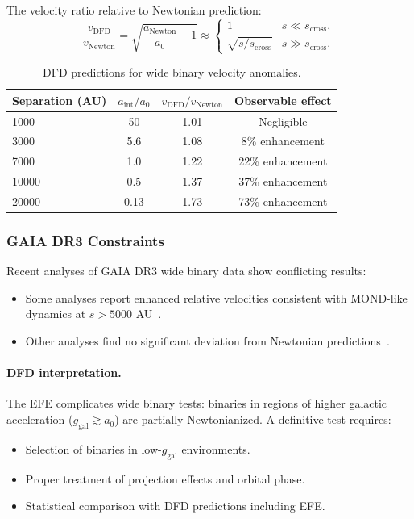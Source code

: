 The velocity ratio relative to Newtonian prediction:
\begin{equation}
\frac{v_{\mathrm{DFD}}}{v_{\mathrm{Newton}}} = \sqrt{\frac{a_{\mathrm{Newton}}}{a_0} + 1} \approx 
\begin{cases}
1 & s \ll s_{\mathrm{cross}}, \\
\sqrt{s/s_{\mathrm{cross}}} & s \gg s_{\mathrm{cross}}.
\end{cases}
\end{equation}

\begin{table}[h]
\centering
\caption{DFD predictions for wide binary velocity anomalies.}\label{tab:wide-binary}
\begin{tabular}{lccc}
\toprule
Separation (AU) & $a_{\mathrm{int}}/a_0$ & $v_{\mathrm{DFD}}/v_{\mathrm{Newton}}$ & Observable effect \\
\midrule
1000 & 50 & 1.01 & Negligible \\
3000 & 5.6 & 1.08 & 8\% enhancement \\
7000 & 1.0 & 1.22 & 22\% enhancement \\
10000 & 0.5 & 1.37 & 37\% enhancement \\
20000 & 0.13 & 1.73 & 73\% enhancement \\
\bottomrule
\end{tabular}
\end{table}

\subsubsection{GAIA DR3 Constraints}

Recent analyses of GAIA DR3 wide binary data show conflicting results:
\begin{itemize}
\item Some analyses report enhanced relative velocities consistent with 
MOND-like dynamics at $s > 5000$ AU~\cite{Chae2023}.
\item Other analyses find no significant deviation from Newtonian 
predictions~\cite{Banik2024}.
\end{itemize}

\paragraph{DFD interpretation.}
The EFE complicates wide binary tests: binaries in regions of higher 
galactic acceleration ($g_{\mathrm{gal}} \gtrsim a_0$) are partially 
Newtonianized. A definitive test requires:
\begin{itemize}
\item Selection of binaries in low-$g_{\mathrm{gal}}$ environments.
\item Proper treatment of projection effects and orbital phase.
\item Statistical comparison with DFD predictions including EFE.
\end{itemize}

